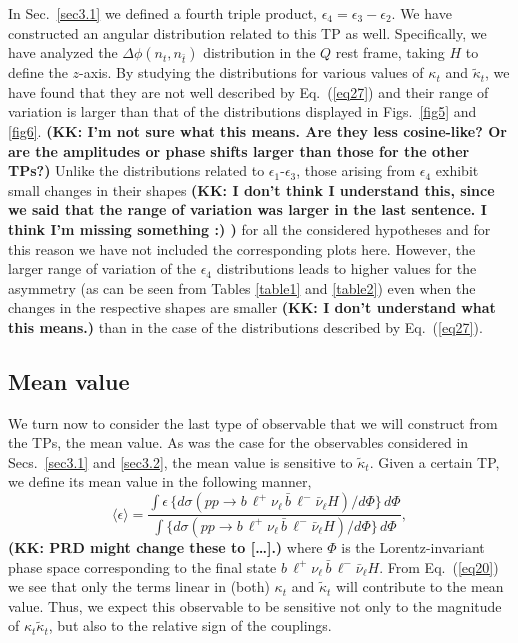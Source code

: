 \documentclass[aps,preprint,tightenlines,floatfix,superscriptaddress,nofootinbib,showpacs]{revtex4-1}
\def\beq{\begin{equation}}
\def\eeq{\end{equation}}
\def\tbar{\bar{t}}
\def\bbar{\bar{b}}
\def\kp{\kappa_t}
\def\kpt{\tilde{\kappa}_t}
\begin{document}
In Sec.~\ref{sec3.1} we defined a fourth triple product,
$\epsilon_4 = \epsilon_3-\epsilon_2$.  We have constructed
an angular distribution related to this TP as well.
Specifically, we have analyzed the
$\Delta\phi(n_t,n_{\tbar})$ distribution in the $Q$ rest frame,
taking
$H$ to define the $z$-axis.  By studying the distributions
for various values of $\kp$ and $\kpt$, we have
found that they are not well described by Eq.~(\ref{eq27})
and their range of variation is larger than that of the distributions
displayed in Figs.~\ref{fig5} and \ref{fig6}.
{\bf (KK: I'm not sure what this means.  Are they less cosine-like?
  Or are the amplitudes or phase shifts larger than those for the other
  TPs?)}
Unlike the distributions
related to $\epsilon_1$-$\epsilon_3$, those arising from $\epsilon_4$
exhibit small changes in their shapes {\bf (KK: I don't think I understand
  this, since we said that the range of variation was larger in the last
  sentence.  I think I'm missing something :) )} for all the considered
hypotheses and for this reason we have not included the corresponding
plots here. However, the larger range of variation of the $\epsilon_4$
distributions leads to higher values for the asymmetry (as can be seen
from Tables \ref{table1} and \ref{table2}) even when the changes in
the respective shapes are smaller {\bf (KK: I don't understand what
  this means.)} than in the case of the
distributions described by Eq.~(\ref{eq27}).  \par
\subsection{Mean value}
\label{sec3.3}
We turn now to consider the last type of observable that we will
construct from the TPs, the mean value. As was the case for the
observables considered in Secs.~\ref{sec3.1} and \ref{sec3.2},
the mean value is sensitive to $\kpt$.  Given a certain
TP, we define its mean value in the following manner,
%
\beq
\label{eq28}
\langle \epsilon \rangle = \frac{\int\epsilon\, \{d\sigma (pp\to b\,\ell^+\nu_{\ell}\,\bbar\,\ell^-\bar{\nu}_{\ell}H)/ d\Phi\}\,d\Phi}{\int \{d\sigma (pp\to b\,\ell^+\nu_{\ell}\,\bbar\,\ell^-\bar{\nu}_{\ell}H)/ d\Phi\}\,d\Phi},
\eeq
%
{\bf (KK: PRD might change these to [\ldots].)}
where $\Phi$ is the Lorentz-invariant phase space corresponding to the
final state
$b\,\ell^+\nu_{\ell}\,\bbar\,\ell^-\bar{\nu}_{\ell}H$. From
Eq.~(\ref{eq20}) we see that only the terms linear in (both) $\kp$ and $\kpt$
will contribute to the mean value.  Thus, we expect this observable
to be sensitive not only to the magnitude of $\kp\kpt$,
but also to the relative sign of
the couplings.\par
\end{document}
